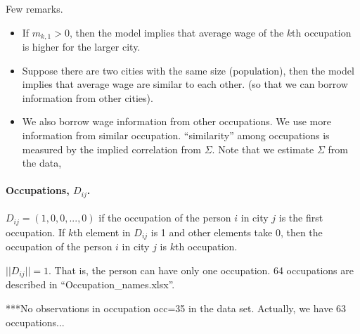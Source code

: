 \documentclass[11pt]{article}
\begin{document}
Few remarks.
\begin{itemize}
\item If $m_{k,1}>0$, then the model implies that average wage of the $k$th occupation is higher for the larger city. 
\item Suppose there are two cities with the same size (population), then the model implies that average wage are similar to each other. (so that we can borrow information from other cities).
\item We also borrow wage information from other occupations. We use more information from similar occupation. ``similarity'' among occupations is measured by the implied correlation from $\Sigma$. Note that we estimate $\Sigma$ from the data, 
\end{itemize}

\paragraph{Occupations, $D_{ij}$.} $D_{ij}=(1,0,0,...,0)$ if the occupation of the person $i$ in city $j$ is the first occupation. If $k$th element in $D_{ij}$ is 1 and other elements take 0, then the occupation of the person $i$ in city $j$ is $k$th occupation. 

$||D_{ij}||=1$. That is, the person can have only one occupation. 64 occupations are described in ``Occupation\_names.xlsx''.

***No observations in occupation occ=35 in the data set. Actually, we have 63 occupations...
\end{document}
